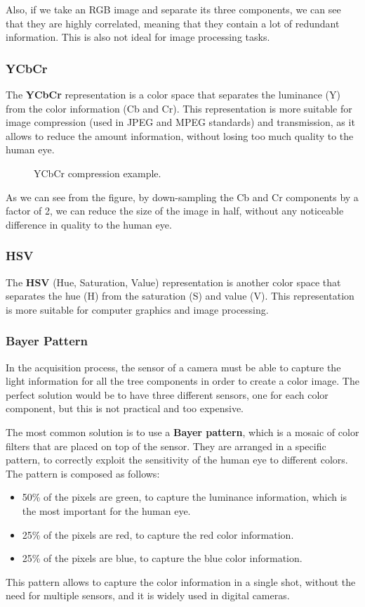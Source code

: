 Also, if we take an RGB image and separate its three components, we can see that they are highly correlated, 
meaning that they contain a lot of redundant information. This is also not ideal for image processing tasks.

\subsubsection{YCbCr}
The \textbf{YCbCr} representation is a color space that separates the luminance (Y) from the color information (Cb and Cr). 
This representation is more suitable for image compression (used in JPEG and MPEG standards) and transmission, as it allows 
to reduce the amount information, without losing too much quality to the human eye.
\begin{figure}[H]
    \centering
    \scalebox{0.8}{
        
    }
    \caption{YCbCr compression example.}
\end{figure}
As we can see from the figure, by down-sampling the Cb and Cr components by a factor of 2, we can reduce the size of the image in half,
without any noticeable difference in quality to the human eye.

\subsubsection{HSV}
The \textbf{HSV} (Hue, Saturation, Value) representation is another color space that separates the hue (H) from the saturation (S) and value (V).
This representation is more suitable for computer graphics and image processing.

\subsubsection{Bayer Pattern}
In the acquisition process, the sensor of a camera must be able to capture the light information for all the tree components in order
to create a color image. The perfect solution would be to have three different sensors, one for each color component, but this is not practical and too expensive.

The most common solution is to use a \textbf{Bayer pattern}, which is a mosaic of color filters that are placed on top of the sensor.
They are arranged in a specific pattern, to correctly exploit the sensitivity of the human eye to different colors. The pattern is composed as follows:
\begin{itemize}
    \item 50\% of the pixels are green, to capture the luminance information, which is the most important for the human eye.
    \item 25\% of the pixels are red, to capture the red color information.
    \item 25\% of the pixels are blue, to capture the blue color information.
\end{itemize}
This pattern allows to capture the color information in a single shot, without the need for multiple sensors, and it is widely used in digital cameras.

